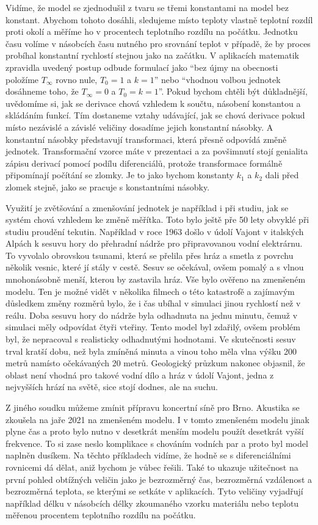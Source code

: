 \documentclass[12pt]{article}
\begin{document}
Vidíme, že model se zjednodušil z tvaru se třemi konstantami na model bez konstant. Abychom tohoto dosáhli, sledujeme místo teploty vlastně teplotní rozdíl proti okolí a měříme ho v procentech teplotního rozdílu na počátku. Jednotku času volíme v násobcích času nutného pro srovnání teplot v případě, že by proces probíhal konstantní rychlostí stejnou jako na začátku. V aplikacích matematik zpravidla uvedený postup odbude formulací jako ``bez újmy na obecnosti položíme $T_\infty$ rovno nule, $T_0=1$ a $k=1$'' nebo ``vhodnou volbou jednotek dosáhneme toho, že $T_\infty=0$ a $T_0=k=1$''. Pokud bychom chtěli být důkladnější, uvědomíme si, jak se derivace chová vzhledem k součtu, násobení konstantou a skládáním funkcí. Tím dostaneme vztahy udávající, jak se chová derivace pokud místo nezávislé a závislé veličiny dosadíme jejich konstantní násobky. A konstantní násobky představují transformaci, která přesně odpovídá změně jednotek. Transformační vzorce máte v prezentaci a za povšimnutí stojí genialita zápisu derivací pomocí podílu diferenciálů, protože transformace formálně připomínají počítání se zlomky. Je to jako bychom konstanty $k_1$ a $k_2$ dali před zlomek stejně, jako se pracuje s konstantními násobky.

Využití je zvětšování a zmenšování jednotek je například i při studiu, jak se systém chová vzhledem ke změně měřítka. Toto bylo ještě pře 50 lety obvyklé při studiu proudění tekutin. Například v  roce 1963 došlo v údolí Vajont v italských Alpách k sesuvu hory do přehradní nádrže pro připravovanou vodní elektrárnu. To vyvolalo obrovskou tsunami, která se přelila přes hráz a smetla z povrchu několik vesnic, které jí stály v cestě. Sesuv se očekával, ovšem pomalý a s vlnou mnohonásobně menší, kterou by zastavila hráz. Vše bylo ověřeno na zmenšeném modelu. Ten je možné vidět v několika filmech o této katastrofě a zajímavým důsledkem změny rozměrů bylo, že i čas ubíhal v simulaci jinou rychlostí než v reálu. Doba sesuvu hory do nádrže byla odhadnuta na jednu minutu, čemuž v simulaci měly odpovídat čtyři vteřiny. Tento model byl zdařilý, ovšem problém byl, že nepracoval s realisticky odhadnutými hodnotami. Ve skutečnosti sesuv trval kratší dobu, než byla zmíněná minuta a vinou toho měla vlna výšku 200 metrů namísto očekávaných 20 metrů. Geologický průzkum nakonec objasnil, že oblast není vhodná pro takové vodní dílo a hráz v údolí Vajont, jedna z nejvyšších hrází na světě, sice stojí dodnes, ale na suchu.

Z jiného soudku můžeme zmínit přípravu koncertní síně pro Brno. Akustika se zkoušela na jaře 2021 na zmenšeném modelu. I v tomto zmenšeném modelu jinak plyne čas a proto bylo nutno v desetkrát menším modelu použít desetkrát vyšší frekvence. To si zase neslo komplikace s chováním vodních par a proto byl model naplněn dusíkem. Na těchto příkladech vidíme, že hodně se s diferenciálními rovnicemi dá dělat, aniž bychom je vůbec řešili. Také to ukazuje užitečnost na první pohled obtížných veličin jako je bezrozměrný čas, bezrozměrná vzdálenost a bezrozměrná teplota, se kterými se setkáte v aplikacích. Tyto veličiny vyjadřují například délku v násobcích délky zkoumaného vzorku materiálu nebo teplotu měřenou procentem teplotního rozdílu na počátku. 
\end{document}
